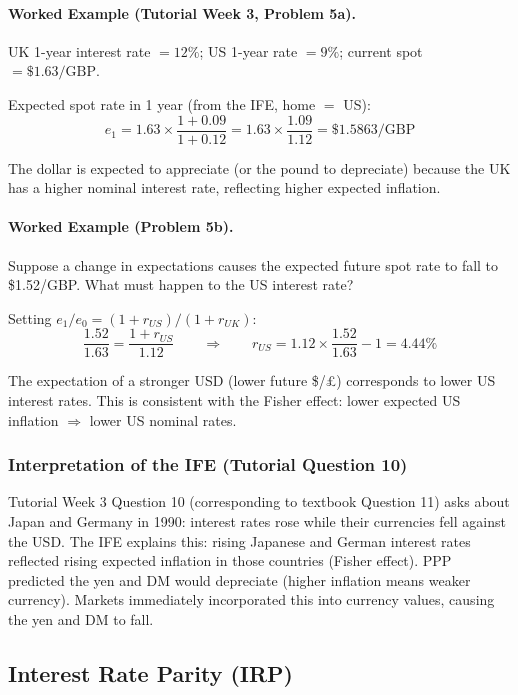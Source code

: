\documentclass[11pt,a4paper]{article}
\begin{document}
\paragraph{Worked Example (Tutorial Week 3, Problem 5a).}

UK 1-year interest rate $= 12\%$; US 1-year rate $= 9\%$; current spot $= \$1.63/\text{GBP}$.

Expected spot rate in 1 year (from the IFE, home $=$ US):
\[
  e_1 = 1.63 \times \frac{1 + 0.09}{1 + 0.12} = 1.63 \times \frac{1.09}{1.12} = \$1.5863/\text{GBP}
\]

The dollar is expected to appreciate (or the pound to depreciate) because the UK has a higher nominal interest rate, reflecting higher expected inflation.

\paragraph{Worked Example (Problem 5b).}

Suppose a change in expectations causes the expected future spot rate to fall to \$1.52/GBP. What must happen to the US interest rate?

Setting $e_1 / e_0 = (1 + r_{US})/(1 + r_{UK})$:
\[
  \frac{1.52}{1.63} = \frac{1 + r_{US}}{1.12} \qquad \Rightarrow \qquad r_{US} = 1.12 \times \frac{1.52}{1.63} - 1 = 4.44\%
\]

The expectation of a stronger USD (lower future \$/£) corresponds to lower US interest rates. This is consistent with the Fisher effect: lower expected US inflation $\Rightarrow$ lower US nominal rates.

\subsubsection{Interpretation of the IFE (Tutorial Question 10)}

Tutorial Week 3 Question 10 (corresponding to textbook Question 11) asks about Japan and Germany in 1990: interest rates rose while their currencies fell against the USD. The IFE explains this: rising Japanese and German interest rates reflected rising expected inflation in those countries (Fisher effect). PPP predicted the yen and DM would depreciate (higher inflation means weaker currency). Markets immediately incorporated this into currency values, causing the yen and DM to fall.

\subsection{Interest Rate Parity (IRP)}
\end{document}
